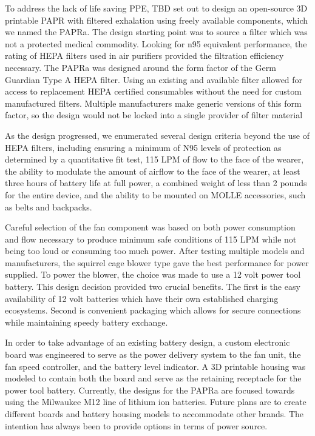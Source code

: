 \documentclass[a4paper]{article}
\begin{document}
{To address the lack of life saving PPE, TBD set out to design an open-source 3D printable PAPR with filtered exhalation using freely available components, which we named the PAPRa. The design starting point was to source a filter which was not a protected medical commodity. Looking for n95 equivalent performance, the rating of HEPA filters used in air purifiers provided the filtration efficiency necessary. The PAPRa was designed around the form factor of the Germ Guardian Type A HEPA filter. Using an existing and available filter allowed for access to replacement HEPA certified consumables without the need for custom manufactured filters. Multiple manufacturers make generic versions of this form factor, so the design would not be locked into a single provider of filter material

As the design progressed, we enumerated several design criteria beyond the use of HEPA filters, including ensuring a minimum of N95 levels of protection as determined by a quantitative fit test, 115 LPM of flow to the face of the wearer, the ability to modulate the amount of airflow to the face of the wearer, at least three hours of battery life at full power, a combined weight of less than 2 pounds for the entire device, and the ability to be mounted on MOLLE accessories, such as belts and backpacks.

Careful selection of the fan component was based on both power consumption and flow necessary to produce minimum safe conditions of 115 LPM while not being too loud or consuming too much power. After testing multiple models and manufacturers, the squirrel cage blower type gave the best performance for power supplied. To power the blower, the choice was made to use a 12 volt power tool battery. This design decision provided two crucial benefits. The first is the easy availability of 12 volt batteries which have their own established charging ecosystems. Second is convenient packaging which allows for secure connections while maintaining speedy battery exchange.

In order to take advantage of an existing battery design, a custom electronic board was engineered to serve as the power delivery system to the fan unit, the fan speed controller, and the battery level indicator. A 3D printable housing was modeled to contain both the board and serve as the retaining receptacle for the power tool battery. Currently, the designs for the PAPRa are focused towards using the Milwaukee M12 line of lithium ion batteries. Future plans are to create different boards and battery housing models to accommodate other brands. The intention has always been to provide options in terms of power source.

}
\end{document}

